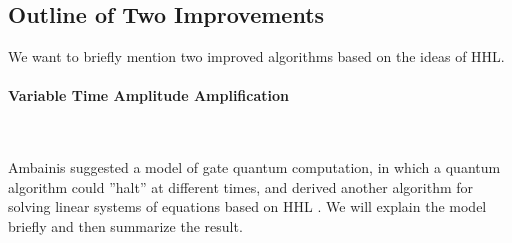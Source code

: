 \subsection{Outline of Two Improvements }

We want to briefly mention two improved algorithms based on the ideas of HHL.

\paragraph*{Variable Time Amplitude Amplification} \phantom{}\\\phantom{}

Ambainis suggested a model of gate quantum computation, in which a quantum algorithm could ''halt'' at different times, and derived another algorithm for solving linear systems of equations based on HHL \cite{Ambainis2010}. We will explain the model briefly and then summarize the result.

